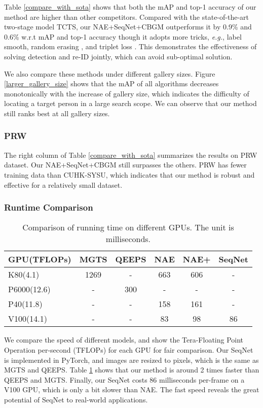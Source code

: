 \documentclass[letterpaper]{article} \usepackage{aaai21}  \usepackage{times}  \usepackage{helvet} \usepackage{courier}  \usepackage[hyphens]{url}  \usepackage{graphicx} \urlstyle{rm} \def\UrlFont{\rm}  \usepackage{natbib}  \usepackage{caption} \usepackage{multirow}
\begin{document}
Table \ref{compare_with_sota} shows that both the mAP and top-1 accuracy of our method are higher than other competitors. Compared with the state-of-the-art two-stage model TCTS, our NAE+SeqNet+CBGM outperforms it by 0.9\% and 0.6\% w.r.t mAP and top-1 accuracy though it adopts more tricks, \textit{e.g.}, label smooth, random erasing \cite{random-erasing}, and triplet loss \cite{triplet-loss}.
This demonstrates the effectiveness of solving detection and re-ID jointly, which can avoid sub-optimal solution.

We also compare these methods under different gallery sizes. Figure \ref{larger_gallery_size} shows that the mAP of all algorithms decreases monotonically with the increase of gallery size, which indicates the difficulty of locating a target person in a large search scope. We can observe that our method still ranks best at all gallery sizes.

\subsubsection{PRW}
The right column of Table \ref{compare_with_sota} summarizes the results on PRW dataset. Our NAE+SeqNet+CBGM still surpasses the others. PRW has fewer training data than CUHK-SYSU, which indicates that our method is robust and effective for a relatively small dataset.

\subsubsection{Runtime Comparison}
\begin{table}[t]
    \centering
\resizebox{0.9\columnwidth}{!}
    {
        \begin{tabular}{|l|ccccc|}
            \hline
            GPU(TFLOPs) & MGTS & QEEPS & NAE & NAE+ & SeqNet \\ \hline \hline
            K80(4.1)    & 1269 & -     & 663 & 606  & -      \\
            P6000(12.6) & -    & 300   & -   & -    & -      \\
            P40(11.8)   & -    & -     & 158 & 161  & -      \\
            V100(14.1)  & -    & -     & 83  & 98   & 86     \\ \hline
        \end{tabular}
    }
    \caption{Comparison of running time on different GPUs. The unit is milliseconds.}
    \label{time_comparison}
\end{table}
We compare the speed of different models, and show the Tera-Floating Point Operation per-second (TFLOPs) for each GPU for fair comparison. Our SeqNet is implemented in PyTorch, and images are resized to  pixels, which is the same as MGTS and QEEPS. Table \ref{time_comparison} shows that our method is around 2 times faster than QEEPS and MGTS. Finally, our SeqNet costs 86 milliseconds per-frame on a V100 GPU, which is only a bit slower than NAE. The fast speed reveals the great potential of SeqNet to real-world applications.
\end{document}
